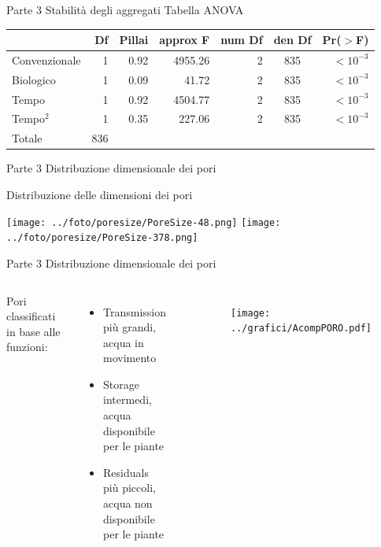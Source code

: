 \documentclass[xcolor={usenames, table, x11names}, final, 10pt]{beamer}
\begin{document}
\begin{frame}[label=Anova]{Parte 3 \small{Stabilità degli aggregati}}
  \hyperlink{Composizionale}{}
  \footnotesize
  Tabella ANOVA 
  \begin{table}
    \centering
    \begin{tabular}{lrrrrcr}
      \toprule
      & Df&Pillai& approx F & num Df & den Df & Pr($>$F) \\ 
      \midrule
      Convenzionale & 1 & 0.92 & 4955.26  &      2 &    835 & $<10^{-3}$\\ 
      Biologico     & 1 & 0.09 & 41.72    &      2 &    835 & $<10^{-3}$\\ 
      Tempo         & 1 & 0.92 & 4504.77  &      2 &    835 & $<10^{-3}$\\ 
      Tempo$^2$     & 1 & 0.35 & 227.06   &      2 &    835 & $<10^{-3}$\\ 
      Totale        & 836 &    &          &        &        &          \\ 
      \bottomrule
    \end{tabular}
  \end{table}
\end{frame}

\begin{frame}{Parte 3 \small{Distribuzione dimensionale dei pori}}
\begin{center}
\LARGE Distribuzione delle dimensioni dei pori

\vspace{1.5cm}

    \texttt{[image: ../foto/poresize/PoreSize-48.png]}
    \texttt{[image: ../foto/poresize/PoreSize-378.png]}
\end{center}
\end{frame}


\begin{frame}[label=Porosimetria]{Parte 3 \small{Distribuzione dimensionale dei pori}}
\begin{columns}
\footnotesize{
Pori classificati in base alle funzioni:
\begin{itemize}
    \item Transmission \\ più grandi, \\acqua in movimento
    \item Storage \\ intermedi,\\ acqua disponibile per le
      piante
    \item Residuals \\ più piccoli,\\acqua non disponibile
      per le piante
\end{itemize}}
\hyperlink{finale}{}
  
  \begin{figure}
    \texttt{[image: ../grafici/AcompPORO.pdf]}
  \end{figure}

\end{columns}
\end{frame}
\end{document}
